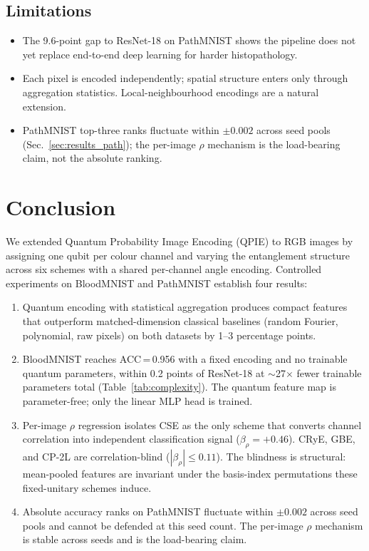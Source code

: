 \documentclass[conference,compsoc]{IEEEtran}
\begin{document}
\subsection{Limitations}

\begin{itemize}
    \item The 9.6-point gap to ResNet-18 on PathMNIST shows the pipeline does not yet replace end-to-end deep learning for harder histopathology.
    \item Each pixel is encoded independently; spatial structure enters only through aggregation statistics. Local-neighbourhood encodings are a natural extension.
    \item PathMNIST top-three ranks fluctuate within $\pm 0.002$ across seed pools (Sec.~\ref{sec:results_path}); the per-image $\rho$ mechanism is the load-bearing claim, not the absolute ranking.
\end{itemize}

\section{Conclusion}
\label{sec:conclusion}

We extended Quantum Probability Image Encoding (QPIE) to RGB images by assigning one qubit per colour channel and varying the entanglement structure across six schemes with a shared per-channel angle encoding. Controlled experiments on BloodMNIST and PathMNIST establish four results:
\begin{enumerate}
    \item Quantum encoding with statistical aggregation produces compact features that outperform matched-dimension classical baselines (random Fourier, polynomial, raw pixels) on both datasets by 1--3 percentage points.
    \item BloodMNIST reaches ACC\,=\,0.956 with a fixed encoding and no trainable quantum parameters, within 0.2 points of ResNet-18 at $\sim$27$\times$ fewer trainable parameters total (Table~\ref{tab:complexity}). The quantum feature map is parameter-free; only the linear MLP head is trained.
    \item Per-image $\rho$ regression isolates CSE as the only scheme that converts channel correlation into independent classification signal ($\beta_\rho = +0.46$). CRyE, GBE, and CP-2L are correlation-blind ($|\beta_\rho| \leq 0.11$). The blindness is structural: mean-pooled features are invariant under the basis-index permutations these fixed-unitary schemes induce.
    \item Absolute accuracy ranks on PathMNIST fluctuate within $\pm 0.002$ across seed pools and cannot be defended at this seed count. The per-image $\rho$ mechanism is stable across seeds and is the load-bearing claim.
\end{enumerate}
\end{document}
